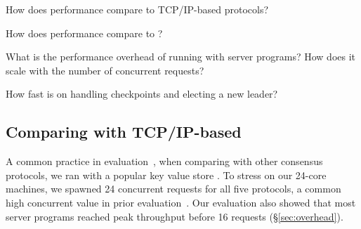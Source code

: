 \begin{tightenum}

\item[\S\ref{sec:eval-traditional}:] How does \xxx performance compare
to TCP/IP-based \paxos protocols?

\item[\S\ref{sec:eval-dare}:] How does \xxx performance compare
to \dare?

\item[\S\ref{sec:overhead}:] What is the performance overhead of running \xxx
with server programs? How does it scale with the number of concurrent 
requests?


\item[\S\ref{sec:robust}:] How fast is \xxx on handling checkpoints and
electing a new leader?



\end{tightenum}





\subsection{Comparing with TCP/IP-based \paxos}
\label{sec:eval-traditional}

A common practice in 
\paxos evaluation~\cite{dare:hpdc15,nopaxos:osdi16}, when comparing \xxx with 
other consensus protocols, we ran \xxx with a popular key value store \redis.  
To stress \xxx on our 24-core machines, we spawned 24 concurrent requests for 
all five protocols, a common high concurrent value in prior 
evaluation~\cite{zookeeper,crane:sosp15,rex:eurosys14}. Our evaluation also 
showed that most server programs reached peak throughput before 16 requests 
(\S\ref{sec:overhead}).


